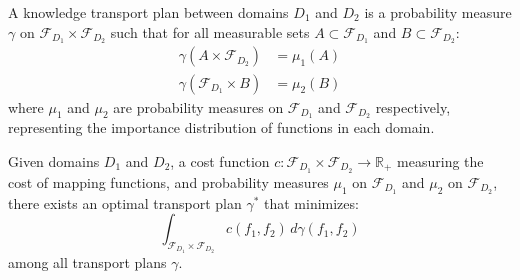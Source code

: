 \begin{definition}
A knowledge transport plan between domains $D_1$ and $D_2$ is a probability measure $\gamma$ on $\mathcal{F}_{D_1} \times \mathcal{F}_{D_2}$ such that for all measurable sets $A \subset \mathcal{F}_{D_1}$ and $B \subset \mathcal{F}_{D_2}$:
\begin{align}
\gamma(A \times \mathcal{F}_{D_2}) &= \mu_1(A) \\
\gamma(\mathcal{F}_{D_1} \times B) &= \mu_2(B)
\end{align}
where $\mu_1$ and $\mu_2$ are probability measures on $\mathcal{F}_{D_1}$ and $\mathcal{F}_{D_2}$ respectively, representing the importance distribution of functions in each domain.
\end{definition}

\begin{theorem}
Given domains $D_1$ and $D_2$, a cost function $c: \mathcal{F}_{D_1} \times \mathcal{F}_{D_2} \to \mathbb{R}_+$ measuring the cost of mapping functions, and probability measures $\mu_1$ on $\mathcal{F}_{D_1}$ and $\mu_2$ on $\mathcal{F}_{D_2}$, there exists an optimal transport plan $\gamma^*$ that minimizes:
\begin{equation}
\int_{\mathcal{F}_{D_1} \times \mathcal{F}_{D_2}} c(f_1, f_2) \, d\gamma(f_1, f_2)
\end{equation}
among all transport plans $\gamma$.
\end{theorem}

